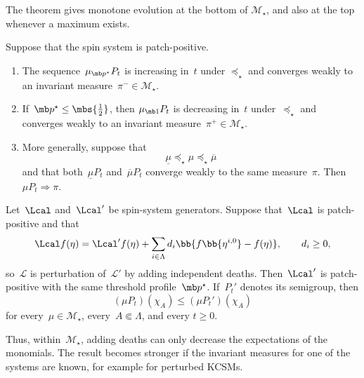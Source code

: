 The theorem gives monotone evolution at the bottom of
$\mathcal M_\star$, and also at the top whenever a maximum exists.

\begin{corollary}
\label{cor:extremal-limits-comparison}
Suppose that the spin system is patch-positive.
\begin{enumerate}[label=\textup{(\roman*)}]
\item The sequence~$\mu_{\mb p^\star}P_t$ is increasing in~$t$ under
$\preceq_\star$ and converges weakly to an invariant measure~$\pi^-\in\mathcal M_\star$.

\item If~$\mb p^\star\leq\mbs{\tfrac12}$, then
$\mu_{\mb 1}P_t$ is decreasing in~$t$ under~$\preceq_\star$ and converges
weakly to an invariant measure~$\pi^+\in\mathcal M_\star$.

\item More generally, suppose that
\begin{equation*}
\underline\mu\preceq_\star\mu\preceq_\star\overline\mu
\end{equation*}
and that both~$\underline\mu P_t$ and~$\overline\mu P_t$ converge weakly to
the same measure~$\pi$. Then~$\mu P_t\Rightarrow\pi$.
\end{enumerate}
\end{corollary}

\begin{corollary}
\label{cor:pure-death-comparison-revision}
Let~$\Lcal$ and~$\Lcal'$ be spin-system generators. Suppose that~$\Lcal$ is
patch-positive and that
\begin{equation}
\label{eq:pure-death-decomposition-revision}
\Lcal f(\eta)
=
\Lcal'f(\eta)
+
\sum_{i\in\Lambda}d_i
\bb{f\bb{\eta^{i,0}}-f(\eta)},
\qquad d_i\geq0,
\end{equation}
so~$\mathcal{L}$ is perturbation of~$\mathcal{L}'$ by adding independent deaths.
Then~$\Lcal'$ is patch-positive with the same threshold profile~$\mb p^\star$.
If~$P_t'$ denotes its semigroup, then
\begin{equation}
\label{eq:pure-death-comparison-revision}
(\mu P_t)(\chi_A)
\leq
(\mu P_t')(\chi_A)
\end{equation}
for every~$\mu\in\mathcal M_\star$, every~$A\Subset\Lambda$, and every
$t\geq0$.
\end{corollary}

Thus, within~$\mathcal M_\star$, adding deaths can only decrease the expectations of the monomials. The result becomes stronger if the invariant measures for one of the systems are known, for example for perturbed KCSMs.

